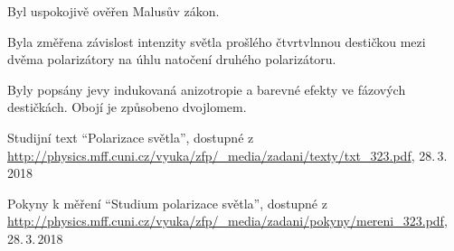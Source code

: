 \documentclass{protokol}
\begin{document}
    Byl uspokojivě ověřen Malusův zákon.

    Byla změřena závislost intenzity světla prošlého čtvrtvlnnou destičkou mezi dvěma polarizátory na úhlu natočení druhého polarizátoru.

    Byly popsány jevy indukovaná anizotropie a barevné efekty ve fázových destičkách. Obojí je způsobeno dvojlomem.

  \begin{thebibliography}{}
 
    Studijní text ``Polarizace světla'', dostupné z\\ \url{http://physics.mff.cuni.cz/vyuka/zfp/_media/zadani/texty/txt_323.pdf}, 28.\,3.\,2018

    Pokyny k měření ``Studium polarizace světla'', dostupné z\\ \url{http://physics.mff.cuni.cz/vyuka/zfp/_media/zadani/pokyny/mereni_323.pdf}, 28.\,3.\,2018
   
  \end{thebibliography}
\end{document}
